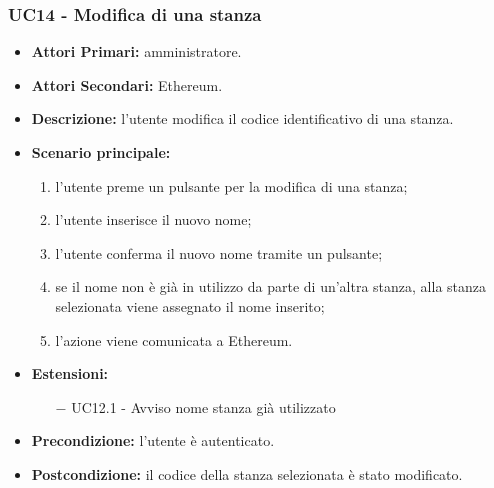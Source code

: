 \subsubsection{UC14 - Modifica di una stanza}
\begin{itemize}
	\item\textbf{Attori Primari:}
	amministratore.
	\item\textbf{Attori Secondari:}
	Ethereum.
	\item\textbf{Descrizione:}
	l'utente modifica il codice identificativo di una stanza.
	\item\textbf{Scenario principale:} 
	\begin{enumerate}
		\item l'utente preme un pulsante per la modifica di una stanza;
		\item l'utente inserisce il nuovo nome;
		\item l'utente conferma il nuovo nome tramite un pulsante;
		\item se il nome non è già in utilizzo da parte di un'altra stanza, alla stanza selezionata viene assegnato il nome inserito;
		\item l'azione viene comunicata a Ethereum.
	\end{enumerate}
	\item\textbf{Estensioni:}
	\begin{itemize}
		\item[$-$] UC12.1 - Avviso nome stanza già utilizzato
	\end{itemize}
	\item\textbf{Precondizione:} 
	l'utente è autenticato.
	\item\textbf{Postcondizione:}
	il codice della stanza selezionata è stato modificato.
\end{itemize}

